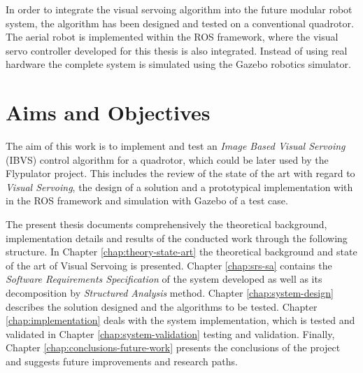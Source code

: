 
In order to integrate the visual servoing algorithm into the future modular robot system, the algorithm has been designed and tested on a conventional quadrotor. The aerial robot is implemented within the ROS framework, where the visual servo controller developed for this thesis is also integrated. Instead of using real hardware the complete system is simulated using the Gazebo robotics simulator.


\section{Aims and Objectives}
\label{sec:aims-objectives}

The aim of this work is to implement and test an \emph{Image Based Visual Servoing} (IBVS) control algorithm for a quadrotor, which could be later used by the Flypulator project. This includes the review of the state of the art with regard to \emph{Visual Servoing}, the design of a solution and a prototypical implementation with in the ROS framework and simulation with Gazebo of a test case.


The present thesis documents comprehensively the theoretical background, implementation details and results of the conducted work through the following structure. In Chapter \ref{chap:theory-state-art} the theoretical background and state of the art of Visual Servoing is presented. Chapter \ref{chap:srs-sa} contains the \emph{Software Requirements Specification} of the system developed as well as its decomposition by \emph{Structured Analysis} method. Chapter \ref{chap:system-design} describes the solution designed and the algorithms to be tested. Chapter \ref{chap:implementation} deals with the system implementation, which is tested and validated in Chapter \ref{chap:system-validation} testing and validation. Finally, Chapter \ref{chap:conclusions-future-work} presents the conclusions of the project and suggests future improvements and research paths.